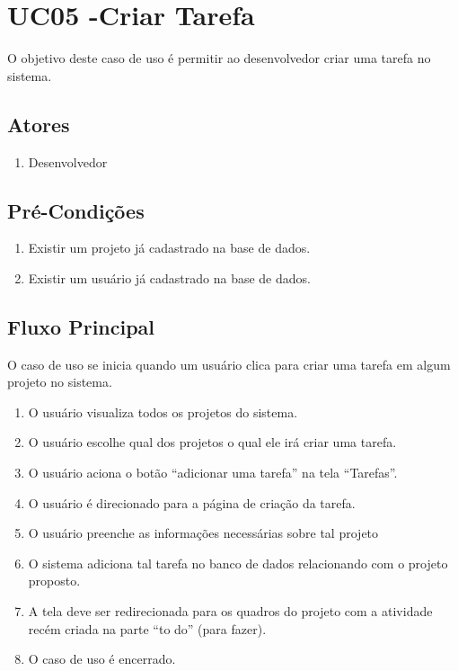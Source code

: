 \section{UC05 -Criar Tarefa}
O objetivo deste caso de uso é permitir ao desenvolvedor criar uma tarefa no sistema.

\subsection{Atores}

\begin{enumerate}
  \item Desenvolvedor
\end{enumerate}

\subsection{Pré-Condições}
\begin{enumerate}
  \item Existir um projeto já cadastrado na base de dados.
  \item Existir um usuário já cadastrado na base de dados.
\end{enumerate}

\subsection{Fluxo Principal}
O caso de uso se inicia quando um usuário clica para criar uma tarefa em algum projeto no sistema.

\begin{enumerate}
  \item O usuário visualiza todos os projetos do sistema.
  \item O usuário escolhe qual dos projetos o qual ele irá criar uma tarefa.
  \item O usuário aciona o botão “adicionar uma tarefa” na tela “Tarefas”.
  \item O usuário é direcionado para a página de criação da tarefa.
  \item O usuário preenche as informações necessárias sobre tal projeto
  \item O sistema adiciona tal tarefa no banco de dados relacionando com o projeto proposto.
  \item A tela deve ser redirecionada para os quadros do projeto com a atividade recém criada na parte “to do” (para fazer).
  \item O caso de uso é encerrado. 
\end{enumerate}


